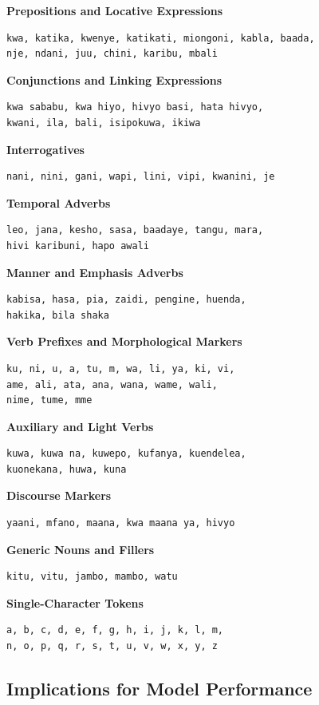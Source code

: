 \textbf{Prepositions and Locative Expressions}
\begin{verbatim}
kwa, katika, kwenye, katikati, miongoni, kabla, baada,
nje, ndani, juu, chini, karibu, mbali
\end{verbatim}

\textbf{Conjunctions and Linking Expressions}
\begin{verbatim}
kwa sababu, kwa hiyo, hivyo basi, hata hivyo,
kwani, ila, bali, isipokuwa, ikiwa
\end{verbatim}

\textbf{Interrogatives}
\begin{verbatim}
nani, nini, gani, wapi, lini, vipi, kwanini, je
\end{verbatim}

\textbf{Temporal Adverbs}
\begin{verbatim}
leo, jana, kesho, sasa, baadaye, tangu, mara,
hivi karibuni, hapo awali
\end{verbatim}

\textbf{Manner and Emphasis Adverbs}
\begin{verbatim}
kabisa, hasa, pia, zaidi, pengine, huenda,
hakika, bila shaka
\end{verbatim}

\textbf{Verb Prefixes and Morphological Markers}
\begin{verbatim}
ku, ni, u, a, tu, m, wa, li, ya, ki, vi,
ame, ali, ata, ana, wana, wame, wali,
nime, tume, mme
\end{verbatim}

\textbf{Auxiliary and Light Verbs}
\begin{verbatim}
kuwa, kuwa na, kuwepo, kufanya, kuendelea,
kuonekana, huwa, kuna
\end{verbatim}

\textbf{Discourse Markers}
\begin{verbatim}
yaani, mfano, maana, kwa maana ya, hivyo
\end{verbatim}

\textbf{Generic Nouns and Fillers}
\begin{verbatim}
kitu, vitu, jambo, mambo, watu
\end{verbatim}

\textbf{Single-Character Tokens}
\begin{verbatim}
a, b, c, d, e, f, g, h, i, j, k, l, m,
n, o, p, q, r, s, t, u, v, w, x, y, z
\end{verbatim}

\subsection*{Implications for Model Performance}

